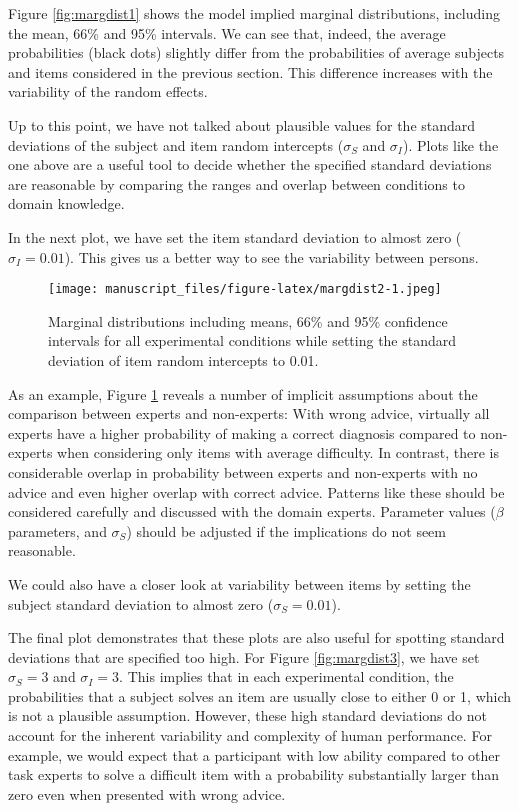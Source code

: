\documentclass[
  man,floatsintext]{apa6}
\begin{document}
Figure \ref{fig:margdist1} shows the model implied marginal distributions, including the mean, 66\% and 95\% intervals. We can see that, indeed, the average probabilities (black dots) slightly differ from the probabilities of average subjects and items considered in the previous section. This difference increases with the variability of the random effects.

Up to this point, we have not talked about plausible values for the standard deviations of the subject and item random intercepts (\(\sigma_S\) and \(\sigma_I\)). Plots like the one above are a useful tool to decide whether the specified standard deviations are reasonable by comparing the ranges and overlap between conditions to domain knowledge.

In the next plot, we have set the item standard deviation to almost zero (\(\sigma_I = 0.01\)). This gives us a better way to see the variability between persons.



\begin{figure}
\centering
\texttt{[image: manuscript\_files/figure-latex/margdist2-1.jpeg]}
\caption{\label{fig:margdist2}Marginal distributions including means, 66\% and 95\% confidence intervals for all experimental conditions while setting the standard deviation of item random intercepts to 0.01.}
\end{figure}

As an example, Figure \ref{fig:margdist2} reveals a number of implicit assumptions about the comparison between experts and non-experts: With wrong advice, virtually all experts have a higher probability of making a correct diagnosis compared to non-experts when considering only items with average difficulty. In contrast, there is considerable overlap in probability between experts and non-experts with no advice and even higher overlap with correct advice. Patterns like these should be considered carefully and discussed with the domain experts. Parameter values (\(\beta\) parameters, and \(\sigma_S\)) should be adjusted if the implications do not seem reasonable.

We could also have a closer look at variability between items by setting the subject standard deviation to almost zero (\(\sigma_S = 0.01\)).

The final plot demonstrates that these plots are also useful for spotting standard deviations that are specified too high. For Figure \ref{fig:margdist3}, we have set \(\sigma_S = 3\) and \(\sigma_I = 3\). This implies that in each experimental condition, the probabilities that a subject solves an item are usually close to either 0 or 1, which is not a plausible assumption. However, these high standard deviations do not account for the inherent variability and complexity of human performance. For example, we would expect that a participant with low ability compared to other task experts to solve a difficult item with a probability substantially larger than zero even when presented with wrong advice.
\end{document}

